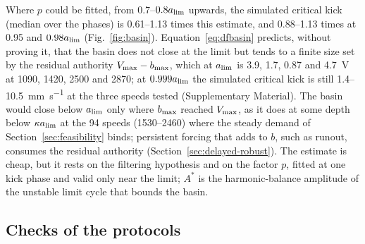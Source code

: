 Where $p$ could be fitted, from 0.7--$0.8a_{\lim}$ upwards, the simulated critical kick (median over the phases) is 0.61--1.13 times this estimate, and 0.88--1.13 times at 0.95 and $0.98a_{\lim}$ (Fig.~\ref{fig:basin}). Equation~\eqref{eq:dfbasin} predicts, without proving it, that the basin does not close at the limit but tends to a finite size set by the residual authority $V_{\max}-b_{\max}$, which at $a_{\lim}$ is 3.9, 1.7, 0.87 and \SI{4.7}{\volt} at 1090, 1420, 2500 and \SI{2870}{\rpm}; at $0.999a_{\lim}$ the simulated critical kick is still 1.4--\SI{10.5}{\milli\metre\per\second} at the three speeds tested (Supplementary Material). The basin would close below $a_{\lim}$ only where $b_{\max}$ reached $V_{\max}$, as it does at some depth below $\kappa a_{\lim}$ at the 94 speeds (1530--\SI{2460}{\rpm}) where the steady demand of Section~\ref{sec:feasibility} binds; persistent forcing that adds to $b$, such as runout, consumes the residual authority (Section~\ref{sec:delayed-robust}). The estimate is cheap, but it rests on the filtering hypothesis and on the factor $p$, fitted at one kick phase and valid only near the limit; $A^*$ is the harmonic-balance amplitude of the unstable limit cycle that bounds the basin.

\subsection{Checks of the protocols}\label{sec:bistab-checks}

